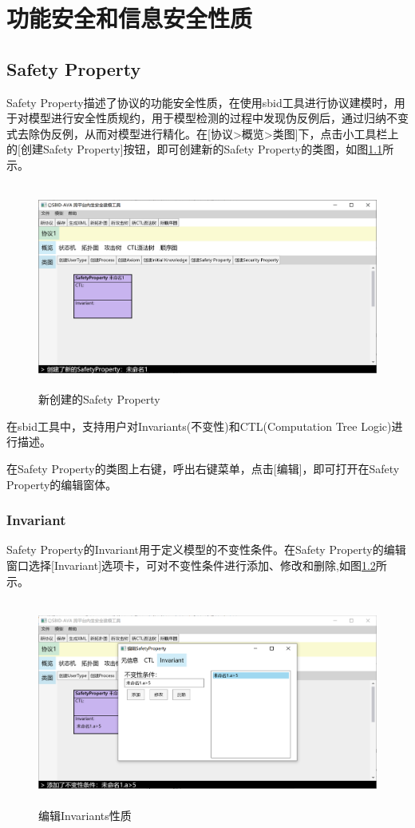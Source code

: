 \chapter{功能安全和信息安全性质}

\section{Safety Property}
Safety Property描述了协议的功能安全性质，在使用sbid工具进行协议建模时，用于对模型进行安全性质规约，用于模型检测的过程中发现伪反例后，通过归纳不变式去除伪反例，从而对模型进行精化。在[协议>概览>类图]下，点击小工具栏上的[创建Safety Property]按钮，即可创建新的Safety Property的类图，如图\ref{create_safety}所示。
\begin{figure}[h]
	\centering
	\includegraphics[width=12cm,height=6.75cm]{imgs/create_safety.png}
	\caption{新创建的Safety Property}
	\label{create_safety}
\end{figure}
\par
在sbid工具中，支持用户对Invariants(不变性)和CTL(Computation Tree Logic)进行描述。
\par
在Safety Property的类图上右键，呼出右键菜单，点击[编辑]，即可打开在Safety Property的编辑窗体。
\subsection{Invariant}
\par
Safety Property的Invariant用于定义模型的不变性条件。在Safety Property的编辑窗口选择[Invariant]选项卡，可对不变性条件进行添加、修改和删除,如图\ref{safety_edit_invariants}所示。
\begin{figure}[h]
	\centering
	\includegraphics[width=12cm,height=6.75cm]{imgs/safety_edit_invariants.png}
	\caption{编辑Invariants性质}
	\label{safety_edit_invariants}
\end{figure}
